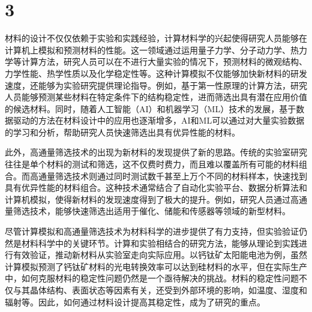 \section{3}
材料的设计不仅仅依赖于实验和实践经验，计算材料学的兴起使得研究人员能够在计算机上模拟和预测材料的性能。这一领域通过运用量子力学、分子动力学、热力学等计算方法，研究人员可以在不进行大量实验的情况下，预测材料的微观结构、力学性能、热学性质以及化学稳定性等。这种计算模拟不仅能够加快新材料的研发速度，还能够为实验研究提供理论指导。例如，基于第一性原理的计算方法，研究人员能够预测某些材料在特定条件下的结构稳定性，进而筛选出具有潜在应用价值的候选材料。同时，随着人工智能（AI）和机器学习（ML）技术的发展，基于数据驱动的方法在材料设计中的应用也逐渐增多，AI和ML可以通过对大量实验数据的学习和分析，帮助研究人员快速筛选出具有优异性能的材料。\par
此外，高通量筛选技术的出现为新材料的发现提供了新的思路。传统的实验室研究往往是单个材料的测试和筛选，这不仅费时费力，而且难以覆盖所有可能的材料组合。而高通量筛选技术则通过同时测试数千甚至上万个不同的材料样本，快速找到具有优异性能的材料组合。这种技术通常结合了自动化实验平台、数据分析算法和计算机模拟，使得新材料的发现速度得到了极大的提升。例如，研究人员通过高通量筛选技术，能够快速筛选出适用于催化、储能和传感器等领域的新型材料。\par
尽管计算模拟和高通量筛选技术为材料科学的进步提供了有力支持，但实验验证仍然是材料科学中的关键环节。计算和实验相结合的研究方法，能够从理论到实践进行有效验证，推动新材料从实验室走向实际应用。以钙钛矿太阳能电池为例，虽然计算模拟预测了钙钛矿材料的光电转换效率可以达到硅材料的水平，但在实际生产中，如何克服材料的稳定性问题仍然是一个亟待解决的挑战。材料的稳定性问题不仅与其晶体结构、表面状态等因素有关，还受到外部环境的影响，如温度、湿度和辐射等。因此，如何通过材料设计提高其稳定性，成为了研究的重点。\par
